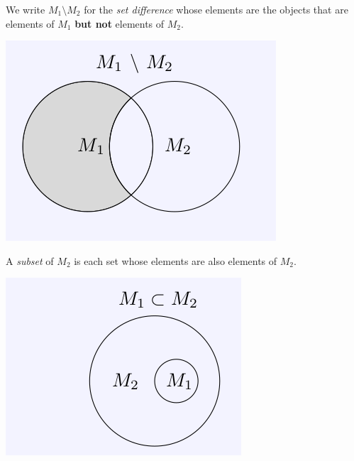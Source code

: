 \begin{Definition}
  We write $M_1\setminus M_2$ for the \emph{set difference} whose elements are the objects that are elements of $M_1$ \textbf{but not} elements of $M_2$.

  \includegraphics{./diff.png}

  A \emph{subset} of $M_2$ is each set whose elements are also elements of $M_2$.

  \includegraphics{./subset.png}

\end{Definition}

